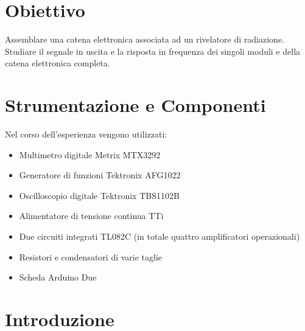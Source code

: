 \documentclass[a4paper,11pt]{article} %
\begin{document}

\section{Obiettivo}

Assemblare una catena elettronica associata ad un rivelatore di radiazione. Studiare il segnale in uscita e la risposta
in frequenza dei singoli moduli e della catena elettronica completa.



\section{Strumentazione e Componenti}\label{s:strumenti}

Nel corso dell'esperienza vengono utilizzati:
\begin{itemize}[itemsep=-0.5ex]
	\item Multimetro digitale Metrix MTX3292
	\item Generatore di funzioni Tektronix AFG1022
	\item Oscilloscopio digitale Tektronix TBS1102B
	\item Alimentatore di tensione continua TTi
	\item Due circuiti integrati TL082C (in totale quattro amplificatori operazionali)
	\item Resistori e condensatori di varie taglie
	\item Scheda Arduino Due
\end{itemize}



\section{Introduzione}\label{s:intro}
\end{document}
